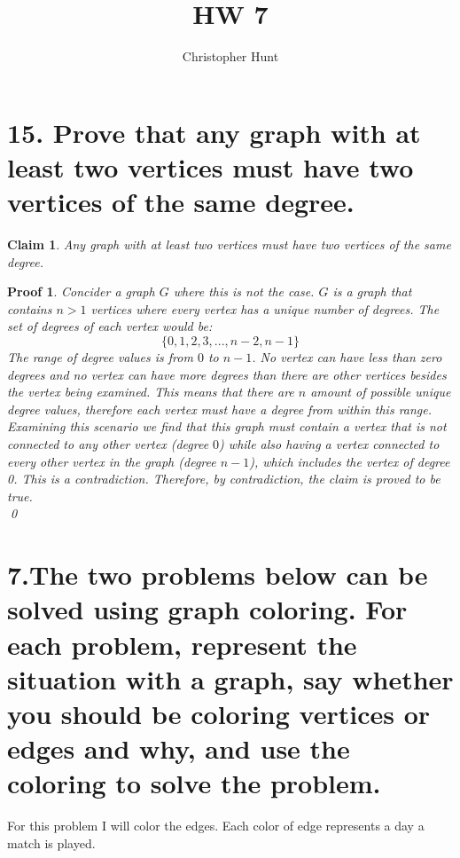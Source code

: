 \documentclass{article}
\title{HW 7}
\author{Christopher Hunt}
\date{}
\newtheorem*{claim}{Claim}
\newtheorem*{poof}{Proof}
\begin{document}
\pagestyle{fancy}
\fancyhf{}
\rhead{\thepage}
\maketitle

\section*{15. Prove that any graph with at least two vertices must have two vertices of the same degree.}
\begin{claim}
    Any graph with at least two vertices must have two vertices of the same degree.
\end{claim}
\begin{poof}
    Concider a graph $G$ where this is not the case. $G$ is a graph that contains $n > 1$ vertices where every vertex has a unique number of degrees. The set of degrees of each vertex would be:
    \[\{0,1,2,3,...,n-2,n-1\}\]
    The range of degree values is from $0$ to $n-1$. No vertex can have less than zero degrees and no vertex can have more degrees than there are other vertices besides the vertex being examined. This means that there are $n$ amount of possible unique degree values, therefore each vertex must have a degree from within this range. Examining this scenario we find that this graph must contain a vertex that is not connected to any other vertex (degree $0$) while also having a vertex connected to every other vertex in the graph (degree $n-1$), which includes the vertex of degree 0. This is a contradiction. Therefore, by contradiction, the claim is proved to be true.\\
    \qed\end{poof}

\newpage
\section*{7.The two problems below can be solved using graph coloring. For each problem, represent the situation with a graph, say whether you should be coloring vertices or edges and why, and use the coloring to solve the problem.}
For this problem I will color the edges. Each color of edge represents a day a match is played.
\end{document}
